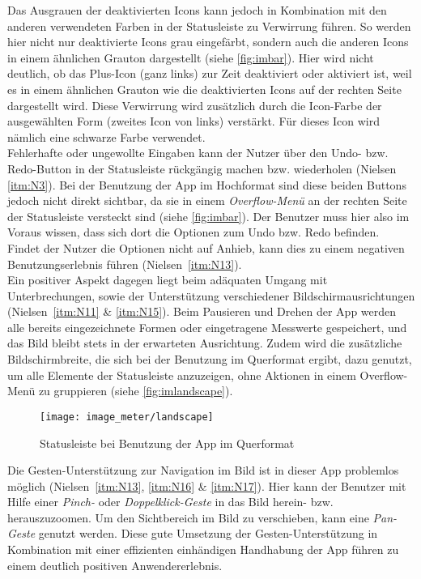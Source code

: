 Das Ausgrauen der deaktivierten Icons kann jedoch in Kombination mit den anderen verwendeten Farben in der Statusleiste zu Verwirrung führen.
So werden hier nicht nur deaktivierte Icons grau eingefärbt, sondern auch die anderen Icons in einem ähnlichen Grauton dargestellt (siehe \autoref{fig:imbar}).
Hier wird nicht deutlich, ob das Plus-Icon (ganz links) zur Zeit deaktiviert oder aktiviert ist, weil es in einem ähnlichen Grauton wie die deaktivierten Icons auf der rechten Seite dargestellt wird.
Diese Verwirrung wird zusätzlich durch die Icon-Farbe der ausgewählten Form (zweites Icon von links) verstärkt.
Für dieses Icon wird nämlich eine schwarze Farbe verwendet. \\

Fehlerhafte oder ungewollte Eingaben kann der Nutzer über den Undo- bzw. Redo-Button in der Statusleiste rückgängig machen bzw. wiederholen (Nielsen \autoref{itm:N3}).
Bei der Benutzung der App im Hochformat sind diese beiden Buttons jedoch nicht direkt sichtbar, da sie in einem \emph{Overflow-Menü} an der rechten Seite der Statusleiste versteckt sind (siehe \autoref{fig:imbar}).
Der Benutzer muss hier also im Voraus wissen, dass sich dort die Optionen zum Undo bzw. Redo befinden.
Findet der Nutzer die Optionen nicht auf Anhieb, kann dies zu einem negativen Benutzungserlebnis führen (Nielsen~\autoref{itm:N13}). \\

Ein positiver Aspekt dagegen liegt beim adäquaten Umgang mit Unterbrechungen, sowie der Unterstützung verschiedener Bildschirmausrichtungen (Nielsen~\autoref{itm:N11} \& \autoref{itm:N15}).
Beim Pausieren und Drehen der App werden alle bereits eingezeichnete Formen oder eingetragene Messwerte gespeichert, und das Bild bleibt stets in der erwarteten Ausrichtung.
Zudem wird die zusätzliche Bildschirmbreite, die sich bei der Benutzung im Querformat ergibt, dazu genutzt, um alle Elemente der Statusleiste anzuzeigen, ohne Aktionen in einem Overflow-Menü zu gruppieren (siehe \autoref{fig:imlandscape}).

\begin{figure}[h]
  \centering
  \texttt{[image: image\_meter/landscape]}
  \caption{Statusleiste bei Benutzung der App im Querformat}
  \label{fig:imlandscape}
\end{figure}

Die Gesten-Unterstützung zur Navigation im Bild ist in dieser App problemlos möglich (Nielsen~\autoref{itm:N13}, \autoref{itm:N16} \& \autoref{itm:N17}).
Hier kann der Benutzer mit Hilfe einer \emph{Pinch-} oder \emph{Doppelklick-Geste} in das Bild herein- bzw. herauszuzoomen.
Um den Sichtbereich im Bild zu verschieben, kann eine \emph{Pan-Geste} genutzt werden.
Diese gute Umsetzung der Gesten-Unterstützung in Kombination mit einer effizienten einhändigen Handhabung der App führen zu einem deutlich positiven Anwendererlebnis. 

